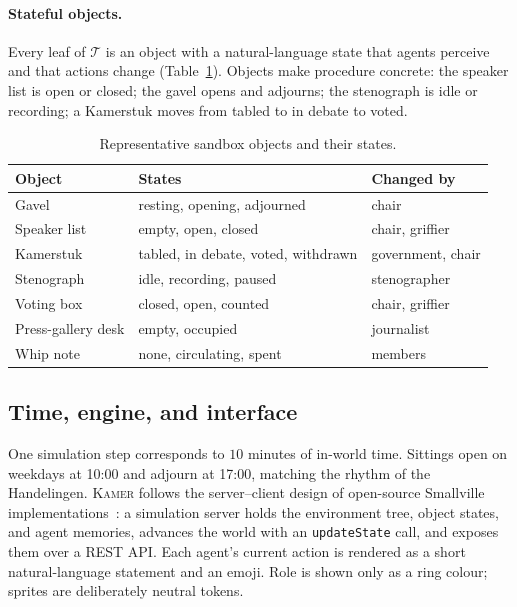 \documentclass[sigconf,review,anonymous]{acmart}
\newcommand{\sys}{\textsc{Kamer}}
\begin{document}
\paragraph{Stateful objects.} Every leaf of $\mathcal{T}$ is an object with
a natural-language state that agents perceive and that actions change
(Table~\ref{tab:objects}). Objects make procedure concrete: the speaker list
is open or closed; the gavel opens and adjourns; the stenograph is idle or
recording; a Kamerstuk moves from tabled to in debate to voted.

\begin{table}[t]
\caption{Representative sandbox objects and their states.}
\label{tab:objects}
\centering\small
\setlength{\tabcolsep}{3pt}
\begin{tabular}{lll}
\toprule
Object & States & Changed by \\
\midrule
Gavel & resting, opening, adjourned & chair \\
Speaker list & empty, open, closed & chair, griffier \\
Kamerstuk & tabled, in debate, voted, withdrawn & government, chair \\
Stenograph & idle, recording, paused & stenographer \\
Voting box & closed, open, counted & chair, griffier \\
Press-gallery desk & empty, occupied & journalist \\
Whip note & none, circulating, spent & members \\
\bottomrule
\end{tabular}
\end{table}

\subsection{Time, engine, and interface}

One simulation step corresponds to $10$ minutes of in-world time.
Sittings open on weekdays at 10:00 and adjourn at 17:00, matching the
rhythm of the Handelingen. \sys{} follows the server--client design of
open-source Smallville implementations~\cite{smallvillerepo}: a simulation
server holds the environment tree, object states, and agent memories,
advances the world with an \texttt{updateState} call, and exposes them over
a REST API. Each agent's current action is rendered as a short
natural-language statement and an emoji. Role is shown only as a ring
colour; sprites are deliberately neutral tokens.
\end{document}
